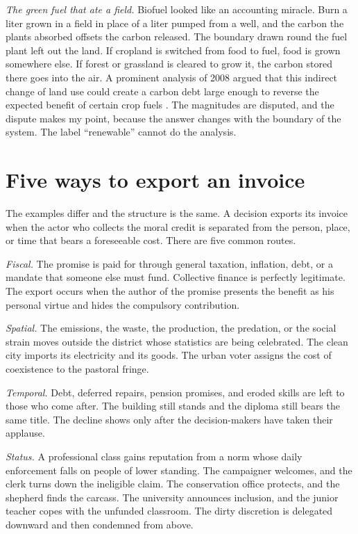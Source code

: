 \documentclass[12pt,a4paper]{book}
\begin{document}
\emph{The green fuel that ate a field.} Biofuel looked like an accounting miracle. Burn a liter grown in a field in place of a liter pumped from a well, and the carbon the plants absorbed offsets the carbon released. The boundary drawn round the fuel plant left out the land. If cropland is switched from food to fuel, food is grown somewhere else. If forest or grassland is cleared to grow it, the carbon stored there goes into the air. A prominent analysis of 2008 argued that this indirect change of land use could create a carbon debt large enough to reverse the expected benefit of certain crop fuels \cite{SearchingerEtAl2008}. The magnitudes are disputed, and the dispute makes my point, because the answer changes with the boundary of the system. The label ``renewable'' cannot do the analysis.

\section{Five ways to export an invoice}

The examples differ and the structure is the same. A decision exports its invoice when the actor who collects the moral credit is separated from the person, place, or time that bears a foreseeable cost. There are five common routes.

\emph{Fiscal.} The promise is paid for through general taxation, inflation, debt, or a mandate that someone else must fund. Collective finance is perfectly legitimate. The export occurs when the author of the promise presents the benefit as his personal virtue and hides the compulsory contribution.

\emph{Spatial.} The emissions, the waste, the production, the predation, or the social strain moves outside the district whose statistics are being celebrated. The clean city imports its electricity and its goods. The urban voter assigns the cost of coexistence to the pastoral fringe.

\emph{Temporal.} Debt, deferred repairs, pension promises, and eroded skills are left to those who come after. The building still stands and the diploma still bears the same title. The decline shows only after the decision-makers have taken their applause.

\emph{Status.} A professional class gains reputation from a norm whose daily enforcement falls on people of lower standing. The campaigner welcomes, and the clerk turns down the ineligible claim. The conservation office protects, and the shepherd finds the carcass. The university announces inclusion, and the junior teacher copes with the unfunded classroom. The dirty discretion is delegated downward and then condemned from above.
\end{document}
